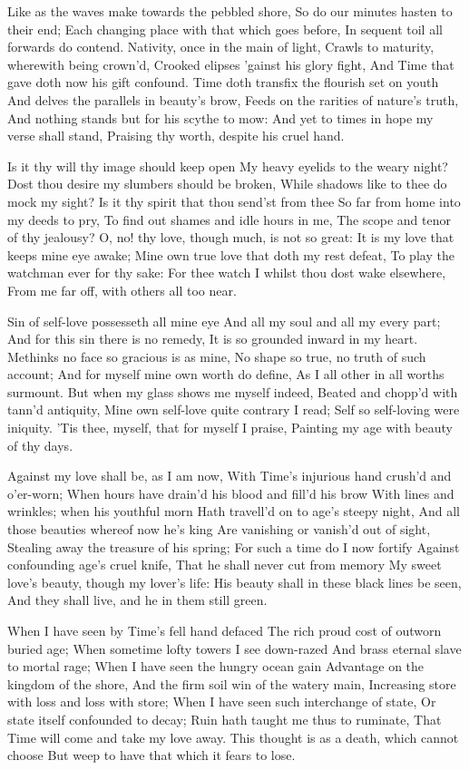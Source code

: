 \documentclass[twocolumn]{book}
\begin{document}
Like as the waves make towards the pebbled shore,
So do our minutes hasten to their end;
Each changing place with that which goes before,
In sequent toil all forwards do contend.
Nativity, once in the main of light,
Crawls to maturity, wherewith being crown'd,
Crooked elipses 'gainst his glory fight,
And Time that gave doth now his gift confound.
Time doth transfix the flourish set on youth
And delves the parallels in beauty's brow,
Feeds on the rarities of nature's truth,
And nothing stands but for his scythe to mow:
  And yet to times in hope my verse shall stand,
  Praising thy worth, despite his cruel hand.


Is it thy will thy image should keep open
My heavy eyelids to the weary night?
Dost thou desire my slumbers should be broken,
While shadows like to thee do mock my sight?
Is it thy spirit that thou send'st from thee
So far from home into my deeds to pry,
To find out shames and idle hours in me,
The scope and tenor of thy jealousy?
O, no! thy love, though much, is not so great:
It is my love that keeps mine eye awake;
Mine own true love that doth my rest defeat,
To play the watchman ever for thy sake:
  For thee watch I whilst thou dost wake elsewhere,
  From me far off, with others all too near.


Sin of self-love possesseth all mine eye
And all my soul and all my every part;
And for this sin there is no remedy,
It is so grounded inward in my heart.
Methinks no face so gracious is as mine,
No shape so true, no truth of such account;
And for myself mine own worth do define,
As I all other in all worths surmount.
But when my glass shows me myself indeed,
Beated and chopp'd with tann'd antiquity,
Mine own self-love quite contrary I read;
Self so self-loving were iniquity.
  'Tis thee, myself, that for myself I praise,
  Painting my age with beauty of thy days.


Against my love shall be, as I am now,
With Time's injurious hand crush'd and o'er-worn;
When hours have drain'd his blood and fill'd his brow
With lines and wrinkles; when his youthful morn
Hath travell'd on to age's steepy night,
And all those beauties whereof now he's king
Are vanishing or vanish'd out of sight,
Stealing away the treasure of his spring;
For such a time do I now fortify
Against confounding age's cruel knife,
That he shall never cut from memory
My sweet love's beauty, though my lover's life:
  His beauty shall in these black lines be seen,
  And they shall live, and he in them still green.


When I have seen by Time's fell hand defaced
The rich proud cost of outworn buried age;
When sometime lofty towers I see down-razed
And brass eternal slave to mortal rage;
When I have seen the hungry ocean gain
Advantage on the kingdom of the shore,
And the firm soil win of the watery main,
Increasing store with loss and loss with store;
When I have seen such interchange of state,
Or state itself confounded to decay;
Ruin hath taught me thus to ruminate,
That Time will come and take my love away.
  This thought is as a death, which cannot choose
  But weep to have that which it fears to lose.
\end{document}
